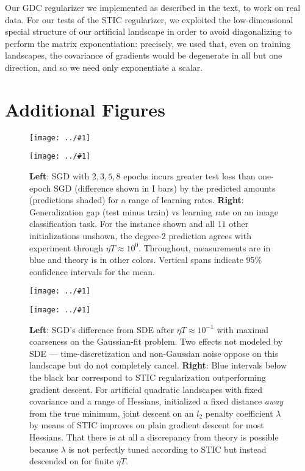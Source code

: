 \documentclass{article}
\theoremstyle{plain}
\theoremstyle{definition}
\newcommand{\plotmoo}[3]{
    \texttt{[image: ../\#1]}
}
\begin{document}
        Our GDC regularizer we implemented as described in the text, to work
        on real data.  For our tests of the STIC regularizer, we exploited the
        low-dimensional special structure of our artificial landscape in order
        to avoid diagonalizing to perform the matrix exponentiation: precisely,
        we used that, even on training landscapes, the covariance of gradients
        would be degenerate in all but one direction, and so we need only 
        exponentiate a scalar.

\section{Additional Figures}\label{sect:figures}

    \begin{figure}[h]
        \centering
        \plotmoo{plots/multi-fashion-logistic-0}{0.48\columnwidth}{4.0cm}
        \plotmoo{plots/gen-cifar}{0.48\columnwidth}{3.0cm}
        \caption{
            {\bf Left}: SGD with $2, 3, 5, 8$ epochs incurs greater test
            loss than one-epoch SGD (difference shown in I bars) by the
            predicted amounts (predictions shaded) for a range of learning
            rates.
            {\bf Right}:
            Generalization gap (test minus train) vs learning rate on an
            image classification task.  For the instance shown and all $11$
            other initializations unshown, the degree-$2$ prediction agrees
            with experiment through $\eta T \approx 10^0$.  Throughout,
            measurements are in blue and theory is in other colors.
            Vertical spans indicate 95\% confidence intervals for the mean.
        }
        \label{fig:multiandgen}
    \end{figure}

    \begin{figure}[h] 
        \centering
        \plotmoo{plots/vs-sde}{0.48\columnwidth}{4.0cm}
        \plotmoo{plots/tak-reg}{0.48\columnwidth}{4.0cm}
        \caption{
            {\bf Left}: SGD's difference from SDE after $\eta T \approx
            10^{-1}$ with maximal coarseness on the Gaussian-fit problem.  
            Two effects not modeled by SDE --- time-discretization and
            non-Gaussian noise oppose on this landscape but do not
            completely cancel. 
            {\bf Right}: Blue intervals below the black bar correspond to STIC
            regularization outperforming gradient descent. For artificial
            quadratic landscapes with fixed covariance and a range of Hessians,
            initialized a fixed distance \emph{away} from the true minimum,
            joint descent on an $l_2$ penalty coefficient $\lambda$ by means of
            STIC improves on plain gradient descent for most Hessians.  That
            there is at all a discrepancy from theory is possible because
            $\lambda$ is not perfectly tuned according to STIC but instead
            descended on for finite $\eta T$.
        }
        \label{fig:vssdeandtakreg}
    \end{figure}
\end{document}
